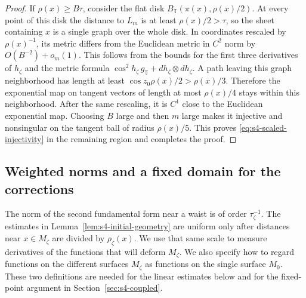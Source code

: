 \documentclass[a4paper,11pt,oneside,reqno]{amsart}
\numberwithin{equation}{section}
\theoremstyle{definition}
\begin{document}
\begin{proof}
    If $\rho(x)\geq B\tau$, consider the flat disk
    $B_{\mathbb T}(\pi(x),\rho(x)/2)$. At every point
    of this disk the distance to $L_m$ is at least
    $\rho(x)/2>\tau$, so the sheet containing $x$ is
    a single graph over the whole disk. In coordinates
    rescaled by $\rho(x)^{-1}$, its metric differs from
    the Euclidean metric in $C^2$ norm by
    $O(B^{-2})+o_m(1)$. This follows from the bounds for
    the first three derivatives of $h_\zeta$ and the
    metric formula $\cos^2h_\zeta\,g_{\mathbb T}
    +dh_\zeta\otimes dh_\zeta$.
    A path leaving this graph neighborhood has length
    at least $\cos z_0\rho(x)/2>\rho(x)/3$.
    Therefore the exponential map on tangent vectors
    of length at most $\rho(x)/4$ stays within this
    neighborhood. After the same rescaling, it is
    $C^1$ close to the Euclidean exponential map.
    Choosing $B$ large and then $m$ large makes it
    injective and nonsingular on the tangent ball of
    radius $\rho(x)/5$. This proves
    \eqref{eq:s4-scaled-injectivity} in the remaining
    region and completes the proof.
\end{proof}

\subsection{Weighted norms and a fixed domain for the corrections}

The norm of the second fundamental form near a waist is of
order $\tau_\zeta^{-1}$. The estimates in
Lemma~\ref{lem:s4-initial-geometry} are uniform only after
distances near $x\in M_\zeta$ are divided by $\rho_\zeta(x)$.
We use that same scale to measure derivatives of the functions
that will deform $M_\zeta$. We also specify how to regard
functions on the different surfaces $M_\zeta$ as functions on
the single surface $M_0$. These two definitions are needed for
the linear estimates below and for the fixed-point argument
in Section~\ref{sec:s4-coupled}.
\end{document}
